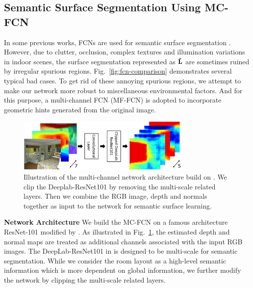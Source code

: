 \subsection{Semantic Surface Segmentation Using MC-FCN}
\label{sec:surfacelabel}
In some previous works, FCNs are used for semantic surface segmentation \cite{dasgupta2016delay,ren2016coarse,mallya2015learning}. 
%
However, due to clutter, occlusion, complex textures and illumination variations in indoor scenes, the surface segmentation represented as $\mathbf{\hat{L}}$ are sometimes ruined by irregular spurious regions. Fig.~\ref{fig:fcn-comparison} demonstrates several typical bad cases.
%
To get rid of these annoying spurious regions, we attempt to make our network more robust to miscellaneous environmental factors. And for this purpose, a multi-channel FCN (MF-FCN) is adopted to incorporate geometric hints generated from the original image. 
%



\begin{figure}
	\centering
	\includegraphics[width=8.5cm]{figure/MC-FCN.png}
	\caption{Illustration of the multi-channel network architecture build on \cite{chen2016deeplab}. We clip the Deeplab-ResNet101 by removing the multi-scale related layers. Then we combine the RGB image, depth and normals together as input to the network for semantic surface learning. }
	\label{fig:fcn-multi-channel}
\end{figure}


\textbf{Network Architecture}
We build the MC-FCN on a famous architecture ResNet-101 \cite{he2016deep} modified by \cite{chen2016deeplab}. As illustrated in Fig.~\ref{fig:fcn-multi-channel}, the estimated depth and normal maps are treated as additional channels associated with the input RGB images. The DeepLab-ResNet101 in \cite{chen2016deeplab} is designed to be multi-scale for semantic segmentation. While we consider the room layout as a high-level semantic information which is more dependent on global information, we further modify the network by clipping the multi-scale related layers. 

